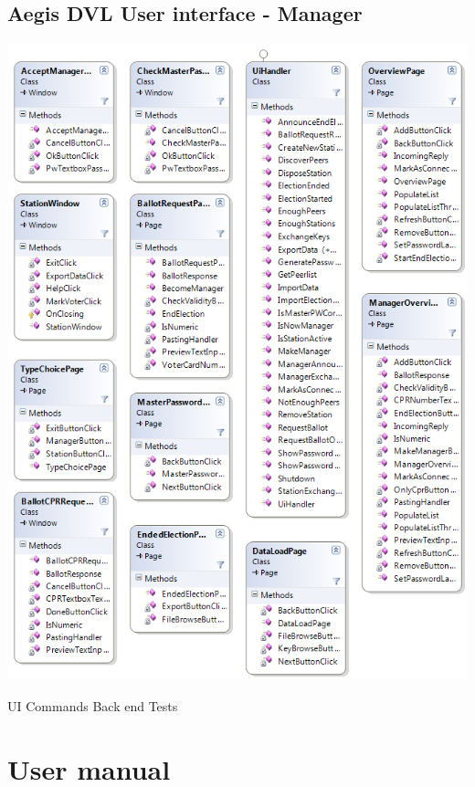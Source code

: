 \documentclass[a4paper]{report}
\begin{document}
\subsection*{ Aegis DVL User interface - Manager}
\begin{center}
\includegraphics[width=\textwidth]{UIClassdiagram_Manager.png}
\end{center}
UI
Commands
Back end
Tests
\section{User manual}
\label{sec:uman}
\end{document}
